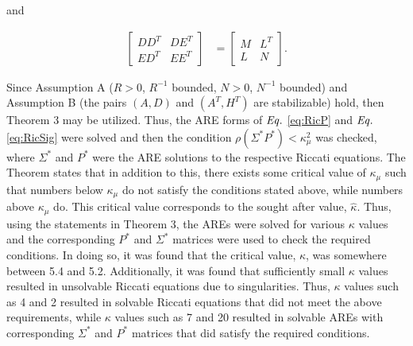 \documentclass[12pt, notitlepage, letterpaper]{article}
\begin{document}
and

\begin{align}
\begin{bmatrix}
DD^T & DE^T \\
ED^T & EE^T
\end{bmatrix}
&=
\begin{bmatrix}
M & L^T \\
L & N
\end{bmatrix}.
\end{align}

Since Assumption A ($R > 0$, $R^{-1}$ bounded, $N > 0$, $N^{-1}$ bounded) and Assumption B (the pairs $(A, D)$ and $(A^T,H^T)$ are stabilizable) hold, then Theorem 3 may be utilized.  Thus, the ARE forms of $\it{Eq.}$ \ref{eq:RicP} and $\it{Eq.}$  \ref{eq:RicSig} were solved and then the condition $\rho(\Sigma^*P^*) < \kappa_{\mu}^2$ was checked, where $\Sigma^*$ and $P^*$ were the ARE solutions to the respective Riccati equations.  The Theorem states that in addition to this, there exists some critical value of $\kappa_{\mu}$ such that numbers below $\kappa_{\mu}$ do not satisfy the conditions stated above, while numbers above $\kappa_{\mu}$ do.  This critical value corresponds to the sought after value, $\hat{\kappa}$.  Thus, using the statements in Theorem 3, the AREs were solved for various $\kappa$ values and the corresponding $P^*$ and $\Sigma^*$ matrices were used to check the required conditions.  In doing so, it was found that the critical value, $\hat{\kappa}$, was somewhere between 5.4 and 5.2.  Additionally, it was found that sufficiently small $\kappa$ values resulted in unsolvable Riccati equations due to singularities.  Thus, $\kappa$ values such as 4 and 2 resulted in solvable Riccati equations that did not meet the above requirements, while $\kappa$ values such as 7 and 20 resulted in solvable AREs with corresponding $\Sigma^*$ and $P^*$ matrices that did satisfy the required conditions.
\end{document}
